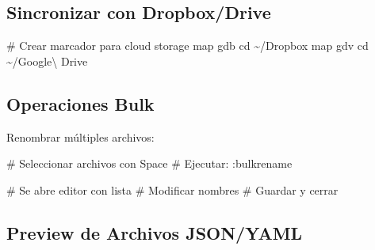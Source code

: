 \documentclass[
  doc,
  floatsintext,
  longtable,
  a4paper,
  nolmodern,
  notxfonts,
  notimes,
  12pt,
  colorlinks=true,linkcolor=blue,citecolor=blue,urlcolor=blue]{apa7}
\newenvironment{Shaded}{\begin{snugshade}}{\end{snugshade}}
\newcommand{\CommentTok}[1]{\textcolor[rgb]{0.37,0.37,0.37}{#1}}
\newcommand{\ExtensionTok}[1]{\textcolor[rgb]{0.00,0.23,0.31}{#1}}
\newcommand{\KeywordTok}[1]{\textcolor[rgb]{0.00,0.23,0.31}{\textbf{#1}}}
\newcommand{\NormalTok}[1]{\textcolor[rgb]{0.00,0.23,0.31}{#1}}
\newcommand{\StringTok}[1]{\textcolor[rgb]{0.13,0.47,0.30}{#1}}
\newcommand{\VariableTok}[1]{\textcolor[rgb]{0.07,0.07,0.07}{#1}}
\begin{document}
\begin{Shaded}
\end{Shaded}

\subsection{Sincronizar con
Dropbox/Drive}\label{sincronizar-con-dropboxdrive}

\begin{Shaded}
\begin{Highlighting}[]
\CommentTok{\# Crear marcador para cloud storage}
\ExtensionTok{map}\NormalTok{ gdb cd \textasciitilde{}/Dropbox}
\ExtensionTok{map}\NormalTok{ gdv cd \textasciitilde{}/Google\textbackslash{} Drive}
\end{Highlighting}
\end{Shaded}

\subsection{Operaciones Bulk}\label{operaciones-bulk}

Renombrar múltiples archivos:

\begin{Shaded}
\begin{Highlighting}[]
\CommentTok{\# Seleccionar archivos con Space}
\CommentTok{\# Ejecutar:}
\ExtensionTok{:bulkrename}

\CommentTok{\# Se abre editor con lista}
\CommentTok{\# Modificar nombres}
\CommentTok{\# Guardar y cerrar}
\end{Highlighting}
\end{Shaded}

\subsection{Preview de Archivos
JSON/YAML}\label{preview-de-archivos-jsonyaml}
\end{document}
